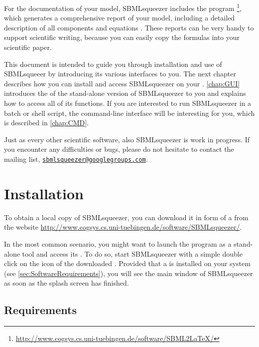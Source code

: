 For the documentation of your model, SBMLsqueezer includes the program
\SBMLLaTeX\footnote{\url{http://www.cogsys.cs.uni-tuebingen.de/software/SBML2LaTeX/}},
which generates a comprehensive report of your model, including a detailed
description of all components and equations \citep{Draeger2009b, Draeger2010a}.
These reports can be very handy to support scientific writing, because you can
easily copy the formulas into your scientific paper.

This document is intended to guide you through installation and use of
SBMLsqueeer by introducing its various interfaces to you. The next chapter
describes how you can install and access SBMLsqueezer on your \OS.
\vref{chap:GUI} introduces the \GUI of the stand-alone
version of SBMLsqueezer to you and explains how to access all of its functions.
If you are interested to run SBMLsqueezer in a batch or shell script, the
command-line interface will be interesting for you, which is described in
\vref{chap:CMD}.

Just as every other scientific software, also SBMLsqueezer is work in progress.
If you encounter any difficulties or bugs, please do not hesitate to contact
the mailing list,
\href{mailto:sbmlsqueezer@googlegroups.com}{\texttt{sbmlsqueezer@google\-groups.com}}. 




\chapter{Installation}

To obtain a local copy of SBMLsqueezer, you can download it in form of a 
\JAR from the website
\url{http://www.cogsys.cs.uni-tuebingen.de/software/SBMLsqueezer/}.

In the most common scenario, you might want to launch the program as a
stand-alone tool and access its \GUI. To do so,
start SBMLsqueezer with a simple double click on the icon of the downloaded
\JAR.
Provided that a \JVM is installed on your system 
(see \vref{sec:SoftwareRequirements}), you will see the main window of
SBMLsqueezer as soon as the splash screen has finished.

\section{Requirements}

